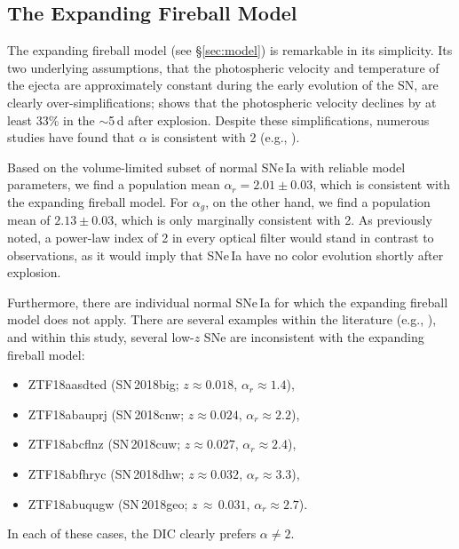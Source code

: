 \documentclass[twocolumn]{./aastex63}
\begin{document}
\subsection{The Expanding Fireball Model}\label{sec:fireball_discussion}

The expanding fireball model (see \S\ref{sec:model}) is remarkable in its
simplicity. Its two underlying assumptions, that the photospheric velocity and
temperature of the ejecta are approximately constant during the early
evolution of the SN, are clearly over-simplifications; \citet{Parrent12} shows
that the photospheric velocity declines by at least 33\% in the $\sim$5\,d
after explosion. Despite these simplifications, numerous studies have found
that $\alpha$ is consistent with 2 (e.g.,
\citealt{Conley06,Hayden10,Ganeshalingam11,Gonzalez-Gaitan12,Zheng17a}).

Based on the volume-limited subset of normal SNe\,Ia with reliable model
parameters, we find a population mean $\alpha_r = 2.01 \pm 0.03$, which is
consistent with the expanding fireball model. For $\alpha_g$, on the other
hand, we find a population mean of $2.13 \pm 0.03$, which is only marginally
consistent with 2. As previously noted, a power-law index of 2 in every
optical filter would stand in contrast to observations, as it would imply that
SNe\,Ia have no color evolution shortly after explosion.

Furthermore, there are individual normal SNe\,Ia for which the expanding
fireball model does not apply. There are several examples within the
literature (e.g.,
\citealt{Zheng13,Zheng14,Goobar15,Miller18,Shappee19,Dimitriadis19}), and
within this study, several low-$z$ SNe are inconsistent with the expanding
fireball model:
% 
\begin{itemize}
\item ZTF18aasdted (SN\,2018big; $z \approx 0.018$, $\alpha_r \approx 1.4$),
\item ZTF18abauprj (SN\,2018cnw; $z \approx 0.024$, $\alpha_r \approx 2.2$),
\item ZTF18abcflnz (SN\,2018cuw; $z \approx 0.027$, $\alpha_r \approx 2.4$),
\item ZTF18abfhryc (SN\,2018dhw; $z \approx 0.032$, $\alpha_r \approx 3.3$), 
\item ZTF18abuqugw (SN\,2018geo; $z\,\approx\,0.031$, $\alpha_r\approx2.7$).
\end{itemize}
% 
In each of these cases, the DIC clearly prefers $\alpha \neq 2$.
\end{document}
